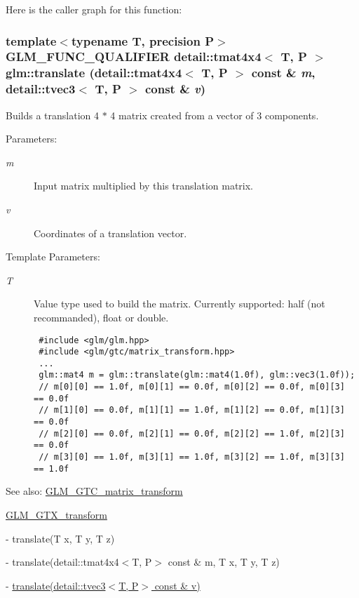 Here is the caller graph for this function:\hypertarget{group__gtc__matrix__transform_gb05e6ebabf535a3d8f9d9bfc3df45143}{
\subsubsection[translate]{\setlength{\rightskip}{0pt plus 5cm}template$<$typename T, precision P$>$ GLM\_\-FUNC\_\-QUALIFIER detail::tmat4x4$<$ T, P $>$ glm::translate (detail::tmat4x4$<$ T, P $>$ const \& {\em m}, \/  detail::tvec3$<$ T, P $>$ const \& {\em v})}}
\label{group__gtc__matrix__transform_gb05e6ebabf535a3d8f9d9bfc3df45143}


Builds a translation 4 $\ast$ 4 matrix created from a vector of 3 components.

\begin{Desc}
\item[Parameters:]
\begin{description}
\item[{\em m}]Input matrix multiplied by this translation matrix. \item[{\em v}]Coordinates of a translation vector. \end{description}
\end{Desc}
\begin{Desc}
\item[Template Parameters:]
\begin{description}
\item[{\em T}]Value type used to build the matrix. Currently supported: half (not recommanded), float or double. 

\begin{Code}\begin{verbatim} #include <glm/glm.hpp>
 #include <glm/gtc/matrix_transform.hpp>
 ...
 glm::mat4 m = glm::translate(glm::mat4(1.0f), glm::vec3(1.0f));
 // m[0][0] == 1.0f, m[0][1] == 0.0f, m[0][2] == 0.0f, m[0][3] == 0.0f
 // m[1][0] == 0.0f, m[1][1] == 1.0f, m[1][2] == 0.0f, m[1][3] == 0.0f
 // m[2][0] == 0.0f, m[2][1] == 0.0f, m[2][2] == 1.0f, m[2][3] == 0.0f
 // m[3][0] == 1.0f, m[3][1] == 1.0f, m[3][2] == 1.0f, m[3][3] == 1.0f
\end{verbatim}
\end{Code}

 \end{description}
\end{Desc}
\begin{Desc}
\item[See also:]\hyperlink{group__gtc__matrix__transform}{GLM\_\-GTC\_\-matrix\_\-transform} 

\hyperlink{group__gtx__transform}{GLM\_\-GTX\_\-transform} 

- translate(T x, T y, T z) 

- translate(detail::tmat4x4$<$T, P$>$ const \& m, T x, T y, T z) 

- \hyperlink{group__gtx__transform_gc06efbcc43ab431cf6ae1ba0e6f03e86}{translate(detail::tvec3$<$T, P$>$ const \& v)} \end{Desc}


